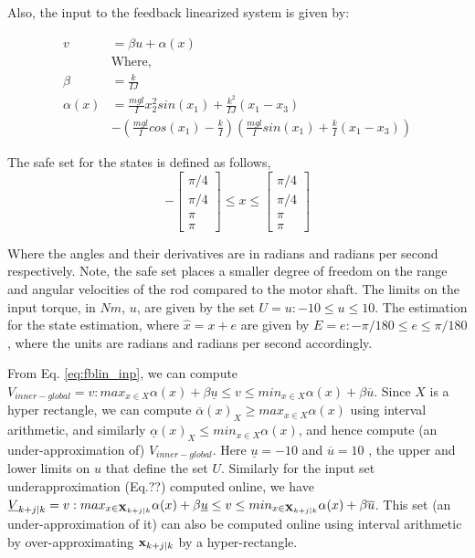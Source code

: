 Also, the input to the feedback linearized system is given by:

\begin{subequations}
\label{eq:fblin_inp}
\begin{align}
v&=\beta u+ \alpha(x) \\
&\text{Where,} \nonumber \\
\beta&=\frac{k}{IJ} \\
\alpha(x)&=\frac{mgl}{I}x_2^2sin(x_1) + \frac{k^2}{IJ}(x_1-x_3) \nonumber \\
&- (\frac{mgl}{I}cos(x_1)-\frac{k}{I})(\frac{mgl}{I}sin(x_1)+\frac{k}{I}(x_1-x_3))
\end{align}
\end{subequations}

The safe set for the states is defined as follows, 
\begin{equation}
 -\begin{bmatrix} \pi/4  \\ \pi/4  \\ \pi \\ \pi \end{bmatrix} \leq x \leq \begin{bmatrix} \pi/4  \\ \pi/4  \\ \pi \\ \pi \end{bmatrix}
\end{equation}

Where the angles and their derivatives are in radians and radians per second respectively. Note, the safe set places a smaller degree of freedom on the range and angular velocities of the rod compared to the motor shaft.
The limits on the input torque, in $Nm$, $u$, are given by the set $U = u :-10 \leq u \leq 10$. The estimation for the state estimation, where $\hat{x} = x + e$ are given by $E = e:-\pi /180 \leq e \leq \pi /180 $, where the units are radians and radians per second accordingly. 

From Eq. \ref{eq:fblin_inp}, we can compute $V_{inner-global} =v: max_{x\in X}\alpha(x) + \beta \underline{u} \leq v \leq min_{x\in X}\alpha(x) + \beta \overline{u}$. Since $X$ is a hyper rectangle, we can compute $\overline{\alpha}(x)_{X} \geq  max_{x\in X}\alpha(x)$ using interval arithmetic, and similarly $\underline{\alpha}(x)_{X} \leq  min_{x\in X}\alpha(x)$, and hence compute (an under-approximation of) $V_{inner-global}$. Here $\underline{u}=-10$ and $\overline{u}=10$ , the upper and lower limits on $u$ that define the set $U$.
Similarly for the input set underapproximation (Eq.??) computed online, we have $\underline{V}_{k+j|k} = v:   max_{x\in \mathbf{X}_{k+j|k}} \alpha(x) + \beta \underline{u} \leq v \leq  min_{x\in \mathbf{X}_{k+j|k}}\alpha(x) + \beta \overline{u}$. This set (an under-approximation of it) can also be computed online using interval arithmetic by over-approximating $\mathbf{x}_{k+j|k}$ by a hyper-rectangle. 

